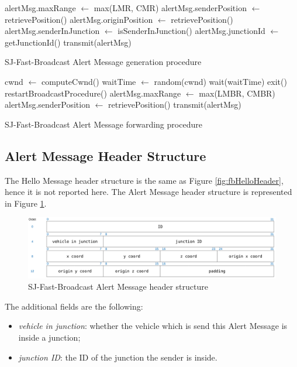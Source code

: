 		\begin{algorithm}[H]
			\begin{algorithmic}[1]
				\State alertMsg.maxRange $\gets$ max(LMR, CMR)
				\State alertMsg.senderPosition $\gets$ retrievePosition()
				\State alertMsg.originPosition $\gets$ retrievePosition()
				\State alertMsg.senderInJunction $\gets$ isSenderInJunction()
				\State alertMsg.junctionId $\gets$ getJunctionId()
				\State transmit(alertMsg)
			\end{algorithmic}
			\caption{SJ-Fast-Broadcast Alert Message generation procedure}
			\label{alg:sj-alert-message-generation}
		\end{algorithm}
		
		\begin{algorithm}[H]
			\begin{algorithmic}[1]
				\State cwnd $\gets$ computeCwnd()
				\State waitTime $\gets$ random(cwnd)
				\State wait(waitTime)
				\State exit()
				\State restartBroadcastProcedure()
				\Else 
				\State alertMsg.maxRange $\gets$ max(LMBR, CMBR)
				\State alertMsg.senderPosition $\gets$ retrievePosition()
				\State transmit(alertMsg)
				\EndIf 
			\end{algorithmic}
			\caption{SJ-Fast-Broadcast Alert Message forwarding procedure}
			\label{alg:sj-alert-message-forwarding}
		\end{algorithm}
	
		\subsection{Alert Message Header Structure}
			The Hello Message header structure is the same as Figure \ref{fig:fbHelloHeader}, hence it is not reported here. The Alert Message header structure is represented in Figure \ref{fig:sj-fbAlertHeader}.
			
			\begin{figure}[H]
				\centering
				\includegraphics[width=\textwidth]{immagini/sj-fbAlertHeader}
				\caption{SJ-Fast-Broadcast Alert Message header structure}
				\label{fig:sj-fbAlertHeader}
			\end{figure}
			
			The additional fields are the following:
			\begin{itemize}
				\item  \textit{vehicle in junction}: whether the vehicle which is send this Alert Message is inside a junction;
				\item \textit{junction ID}: the ID of the junction the sender is inside.
			\end{itemize}